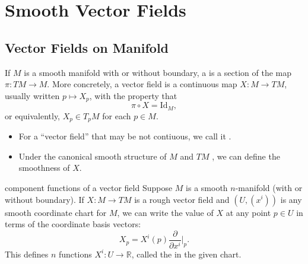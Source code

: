 \documentclass[../main.tex]{subfiles}
\begin{document}
\ifSubfilesClassLoaded{

    
}{}

\chapter{ Smooth Vector Fields }

\section{ Vector Fields on Manifold}
\begin{definition}{}{}
    If $M$ is a smooth manifold with or without boundary, a  is a section of the map $\pi : TM \to M$. More concretely, a vector field is a continuous map $X : M \to TM$, usually written $p \mapsto X_p$, with the property that
\begin{equation}
\pi \circ X = \text{Id}_M,
\end{equation}
or equivalently, $X_p \in T_p M$ for each $p \in M$.
\end{definition}

\begin{remark}
   \begin{itemize}
    \item For a  ``vector field'' that may be not contiuous, we call it .
    \item  Under the canonical smooth structure of \(  M  \) and \(  TM  \) , we can define  the smoothness of \(  X  \). 
   \end{itemize}
   
\end{remark}
\begin{definition}{component functions of a vector field}{}
    Suppose $M$ is a smooth $n$-manifold (with or without boundary). If $X: M \to TM$ is a rough vector field and $(U, (x^i))$ is any smooth coordinate chart for $M$, we can write the value of $X$ at any point $p \in U$ in terms of the coordinate basis vectors:
\begin{equation}
X_p = X^i(p) \frac{\partial}{\partial x^i}\bigg|_p .
\end{equation}
This defines $n$ functions $X^i: U \to \mathbb{R}$, called the  in the given chart.
\end{definition}
\end{document}
